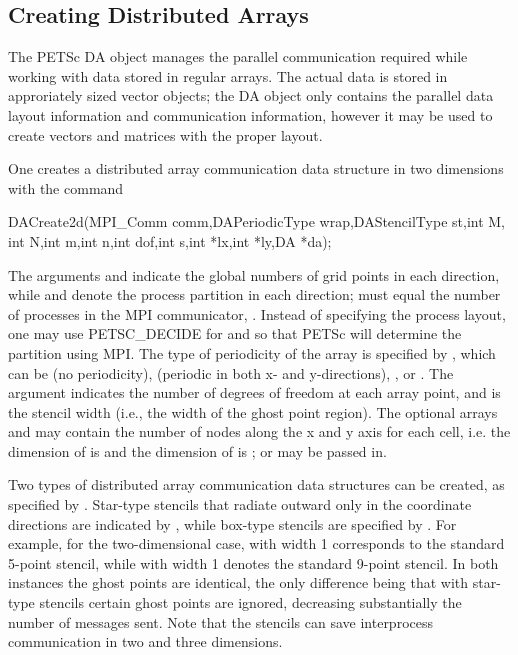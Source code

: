 \subsection{Creating Distributed Arrays}

The PETSc DA object manages the parallel communication required
while working with data stored in regular arrays. The actual data
is stored in approriately sized vector objects; the DA object 
only contains the parallel data layout information and communication
information, however it may be used to create vectors and matrices with the
proper layout.

One creates a distributed array communication data structure 
in two dimensions with the command 
\begin{tabbing}
  DACreate2d(MPI\_Comm comm,DAPeriodicType wrap,DAStencilType st,int M,\\
             int N,int m,int n,int dof,int s,int *lx,int *ly,DA *da);
\end{tabbing}
The   arguments
  and  indicate the global
numbers of grid points in each direction, while  and 
denote the process partition in each direction;  must equal
the number of processes in the MPI communicator, .  
Instead of specifying the process layout, one may use
PETSC\_DECIDE for  and  
so that PETSc will determine the partition using MPI. The type of
periodicity of the array is specified by , which can be 
  (no periodicity), 
  (periodic in
both x- and y-directions),  , 
or .  The argument  
indicates the number of degrees of freedom at each array point,
and  is the stencil width (i.e., the width of the ghost point region).
The optional arrays  and  may contain the number of nodes
along the x and y axis for each cell, i.e. the dimension of  is
 and the dimension of  is ; or  
may be passed in.

Two types of distributed array communication data structures 
can be created, as specified by .
Star-type stencils that radiate outward only in the coordinate
directions are indicated by ,
 while box-type stencils are specified by
.  For example, for the
two-dimensional case,
 with width 1 corresponds to the standard 5-point
stencil, while  with width 1 denotes the
standard 9-point stencil.  In both instances the ghost points are
identical, the only difference being that with star-type stencils
certain ghost points are ignored, decreasing substantially
the number of messages sent.  Note that the 
stencils can save interprocess communication in two and three
dimensions.


